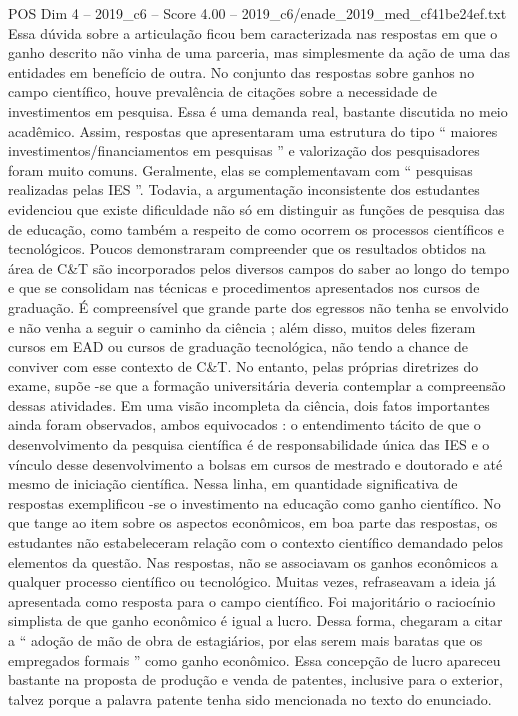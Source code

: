 \begin{textsample}{POS Dim 4 – 2019\_c6 – Score 4.00 – 2019\_c6/enade\_2019\_med\_cf41be24ef.txt}
Essa dúvida sobre a articulação ficou bem caracterizada nas respostas em que o ganho descrito não vinha de uma parceria, mas simplesmente da ação de uma das entidades em benefício de outra.
No conjunto das respostas sobre ganhos no campo científico, houve prevalência de citações sobre a necessidade de investimentos em pesquisa.
Essa é uma demanda real, bastante discutida no meio acadêmico.
Assim, respostas que apresentaram uma estrutura do tipo “ maiores investimentos/financiamentos em pesquisas ” e valorização dos pesquisadores foram muito comuns.
Geralmente, elas se complementavam com “ pesquisas realizadas pelas IES ”.
Todavia, a argumentação inconsistente dos estudantes evidenciou que existe dificuldade não só em distinguir as funções de pesquisa das de educação, como também a respeito de como ocorrem os processos científicos e tecnológicos.
Poucos demonstraram compreender que os resultados obtidos na área de C\&T são incorporados pelos diversos campos do saber ao longo do tempo e que se consolidam nas técnicas e procedimentos apresentados nos cursos de graduação.
É compreensível que grande parte dos egressos não tenha se envolvido e não venha a seguir o caminho da ciência ; além disso, muitos deles fizeram cursos em EAD ou cursos de graduação tecnológica, não tendo a chance de conviver com esse contexto de C\&T.
No entanto, pelas próprias diretrizes do exame, supõe -se que a formação universitária deveria contemplar a compreensão dessas atividades.
Em uma visão incompleta da ciência, dois fatos importantes ainda foram observados, ambos equivocados : o entendimento tácito de que o desenvolvimento da pesquisa científica é de responsabilidade única das IES e o vínculo desse desenvolvimento a bolsas em cursos de mestrado e doutorado e até mesmo de iniciação científica.
Nessa linha, em quantidade significativa de respostas exemplificou -se o investimento na educação como ganho científico.
No que tange ao item sobre os aspectos econômicos, em boa parte das respostas, os estudantes não estabeleceram relação com o contexto científico demandado pelos elementos da questão.
Nas respostas, não se associavam os ganhos econômicos a qualquer processo científico ou tecnológico.
Muitas vezes, refraseavam a ideia já apresentada como resposta para o campo científico.
Foi majoritário o raciocínio simplista de que ganho econômico é igual a lucro.
Dessa forma, chegaram a citar a “ adoção de mão de obra de estagiários, por elas serem mais baratas que os empregados formais ” como ganho econômico.
Essa concepção de lucro apareceu bastante na proposta de produção e venda de patentes, inclusive para o exterior, talvez porque a palavra patente tenha sido mencionada no texto do enunciado.

\end{textsample}
